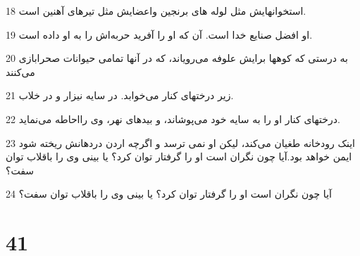 \par 18 استخوانهایش مثل لوله های برنجین واعضایش مثل تیرهای آهنین است.
\par 19 او افضل صنایع خدا است. آن که او را آفرید حربه‌اش را به او داده است.
\par 20 به درستی که کوهها برایش علوفه می‌رویاند، که در آنها تمامی حیوانات صحرابازی می‌کنند
\par 21 زیر درختهای کنار می‌خوابد. در سایه نیزار و در خلاب.
\par 22 درختهای کنار او را به سایه خود می‌پوشاند، و بیدهای نهر، وی رااحاطه می‌نماید.
\par 23 اینک رودخانه طغیان می‌کند، لیکن او نمی ترسد و اگر‌چه اردن دردهانش ریخته شود ایمن خواهد بود.آیا چون نگران است او را گرفتار توان کرد؟ یا بینی وی را باقلاب توان سفت؟
\par 24 آیا چون نگران است او را گرفتار توان کرد؟ یا بینی وی را باقلاب توان سفت؟
 
\chapter{41}

